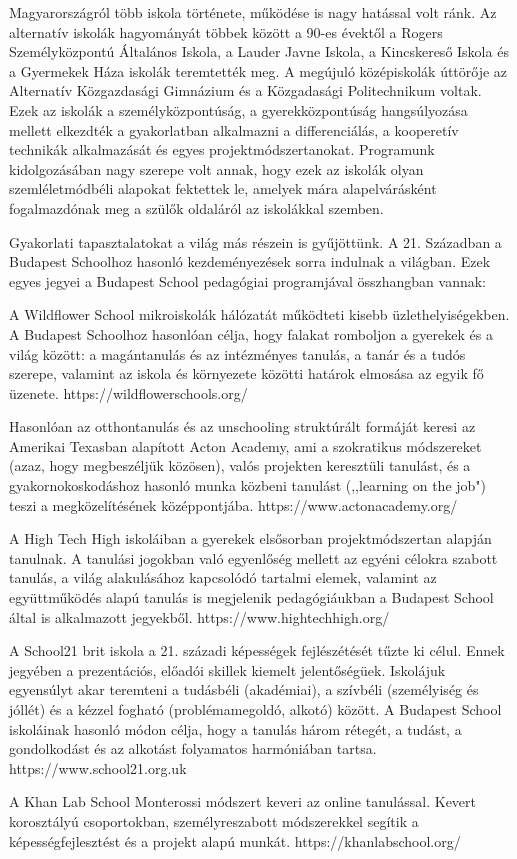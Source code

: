 Magyarországról több iskola története, működése is nagy hatással volt ránk. Az
alternatív iskolák hagyományát többek között a 90-es évektől a Rogers
Személyközpontú Általános Iskola, a Lauder Javne Iskola, a Kincskereső
Iskola és a Gyermekek Háza iskolák teremtették meg. A megújuló
középiskolák úttörője az Alternatív Közgazdasági Gimnázium és a
Közgadasági Politechnikum voltak. Ezek az iskolák a személyközpontúság,
a gyerekközpontúság hangsúlyozása mellett elkezdték a gyakorlatban
alkalmazni a differenciálás, a kooperetív technikák alkalmazását és
egyes projektmódszertanokat. Programunk kidolgozásában nagy szerepe volt
annak, hogy ezek az iskolák olyan szemléletmódbéli alapokat fektettek
le, amelyek mára alapelvárásként fogalmazdónak meg a szülők oldaláról az
iskolákkal szemben.

Gyakorlati tapasztalatokat a világ más részein is gyűjöttünk. A 21.
Században a Budapest Schoolhoz hasonló kezdeményezések sorra indulnak a
világban. Ezek egyes jegyei a Budapest School pedagógiai programjával
összhangban vannak:

A Wildflower School mikroiskolák hálózatát működteti kisebb
üzlethelyiségekben. A Budapest Schoolhoz hasonlóan célja, hogy falakat
romboljon a gyerekek és a világ között: a magántanulás és az intézményes
tanulás, a tanár és a tudós szerepe, valamint az iskola és környezete
közötti határok elmosása az egyik fő üzenete.
https://wildflowerschools.org/

Hasonlóan az otthontanulás és az  unschooling struktúrált formáját keresi az
Amerikai Texasban alapított Acton Academy, ami a szokratikus módszereket (azaz,
hogy megbeszéljük közösen), valós projekten keresztüli tanulást, és a
gyakornokoskodáshoz hasonló munka közbeni tanulást (,,learning on the job")
teszi a megközelítésének középpontjába.
https://www.actonacademy.org/

A High Tech High iskoláiban a gyerekek elsősorban projektmódszertan
alapján tanulnak. A tanulási jogokban való egyenlőség mellett az egyéni
célokra szabott tanulás, a világ alakulásához kapcsolódó tartalmi
elemek, valamint az együttműködés alapú tanulás is megjelenik
pedagógiáukban a Budapest School által is alkalmazott jegyekből.
https://www.hightechhigh.org/

A School21 brit iskola a 21. századi képességek fejlészétését tűzte ki
célul. Ennek jegyében a prezentációs, előadói skillek kiemelt
jelentőségüek. Iskolájuk egyensúlyt akar teremteni a tudásbéli
(akadémiai), a szívbéli (személyiség és jóllét) és a kézzel fogható
(problémamegoldó, alkotó) között. A Budapest School iskoláinak hasonló
módon célja, hogy a tanulás három rétegét, a tudást, a gondolkodást és
az alkotást folyamatos harmóniában tartsa. https://www.school21.org.uk

A Khan Lab School Monterossi módszert keveri az online tanulással. Kevert
korosztályú csoportokban, személyreszabott módszerekkel segítik a
képességfejlesztést és a projekt alapú munkát.
https://khanlabschool.org/
